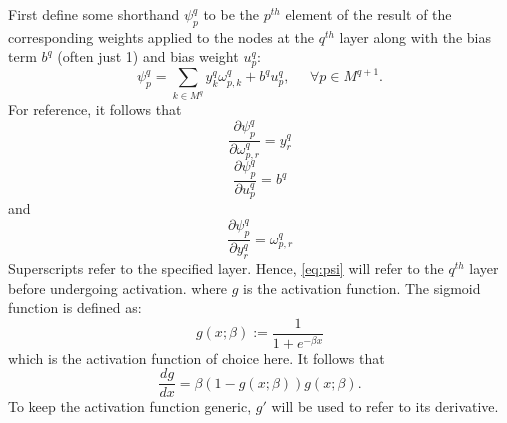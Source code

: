 \documentclass{article}
\begin{document}
First define some shorthand $\psi_p^q$ to be the $p^{th}$ element of the result of the corresponding weights applied to the nodes at the $q^{th}$ layer along with the bias term $b^q$ (often just 1) and bias weight $u_p^q$:
%
\begin{equation} \label{eq:psi}
\psi_p^q = \sum_{k \in M^q} y_k^q \omega_{p,k}^q + b^q u_p^q, \; \; \; \; \; \forall p \in M^{q+1}.
\end{equation}
%
For reference, it follows that
%
\begin{equation} \label{eq:dpsi_w}
\frac{\partial \psi_p^q}{\partial \omega_{p,r}^q} =
y_r^q
\end{equation}
%
\begin{equation} \label{eq:dpsi_u}
\frac{\partial \psi_p^q}{\partial u_p^q} =
b^q
\end{equation}
%
and
%
\begin{equation} \label{eq:dpsi_y}
\frac{\partial \psi_p^q}{\partial y_r^q} =
\omega_{p,r}^q
\end{equation}
%
%
Superscripts refer to the specified layer.
Hence, \eqref{eq:psi} will refer to the $q^{th}$ layer before undergoing activation.
%
where $g$ is the activation function. The sigmoid function is defined as:
%
\begin{equation} \label{eq:g}
g(x;\beta) := \frac{1}{1 + e^{-\beta x}}
\end{equation}
%
which is the activation function of choice here.
It follows that
%
\begin{equation} \label{eq:gp}
\frac{d g}{d x} = \beta \left( 1 - g(x;\beta) \right) g(x; \beta).
\end{equation}
%
To keep the activation function generic, $g'$ will be used to refer to its derivative.
\end{document}
